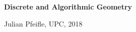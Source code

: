 \documentclass[11pt]{amsart}
\begin{document}
\begin{center}
\textbf{\sffamily
   Discrete and Algorithmic Geometry }

\medskip
   Julian Pfeifle,
   UPC, 2018
\end{center}

\nocite{richter-2011,bokowski-richter-sturmfels-1990,bokowski-richter-1990,gelfand-goresky-mcpherson-serganova-1987,om2,firsching-2018}



\end{document}
